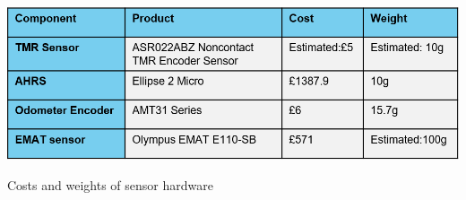 \documentclass[11pt]{article}		%
\newcommand{\supercite}[1]{\textsuperscript{\cite{#1}}}		%
\begin{document}
       	  		\begin{table}[H]
       	  		
       	  		\centering
       	  		\includegraphics[scale=0.7]{smaller component sensor table}
       				\caption{Costs and weights of sensor hardware}
       				\label{sensorHardware}
       			\end{table}				
					
	
					
\end{document}
